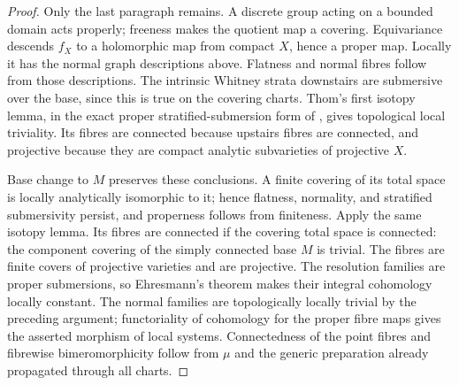 \begin{proof}
Only the last paragraph remains. A discrete group acting on a
bounded domain acts properly; freeness makes the quotient map
a covering. Equivariance descends \(f_X\) to a holomorphic map
from compact \(X\), hence a proper map. Locally it has the
normal graph descriptions above. Flatness and normal fibres
follow from those descriptions. The intrinsic Whitney strata
downstairs are submersive over the base, since this is true on
the covering charts. Thom's first isotopy lemma, in the exact
proper stratified-submersion form of
\cite[Proposition~11.1]{Mather1970}, gives topological local
triviality. Its fibres are connected because upstairs fibres
are connected, and projective because they are compact analytic
subvarieties of projective \(X\).

Base change to \(M\) preserves these conclusions. A finite
covering of its total space is locally analytically isomorphic
to it; hence flatness, normality, and stratified submersivity
persist, and properness follows from finiteness. Apply the same
isotopy lemma. Its fibres are connected if the covering total
space is connected: the component covering of the simply
connected base \(M\) is trivial. The fibres are finite covers
of projective varieties and are projective. The resolution
families are proper submersions, so Ehresmann's theorem makes
their integral cohomology locally constant. The normal families
are topologically locally trivial by the preceding argument;
functoriality of cohomology for the proper fibre maps gives the
asserted morphism of local systems. Connectedness of the point
fibres and fibrewise bimeromorphicity follow from \(\mu\) and
the generic preparation already propagated through all charts.
\end{proof}
